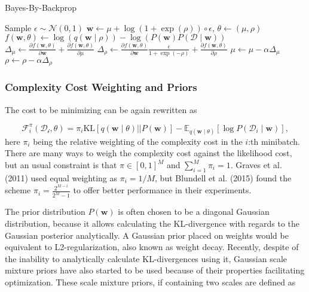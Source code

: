 	\begin{algorithm}[h]
		\caption{Bayes-By-Backprop}
		\label{alg:bbb}
		\begin{algorithmic}[1]
			\State Sample $\epsilon \sim \mathcal{N}(0,1)$ 
			\State $ \pmb{w} \gets \mu + \log(1 + \exp(\rho)) \circ  \epsilon$, $\theta \gets (\mu, \rho)$ 
			\State $f(\pmb{w}, \theta) \gets \log(q(\pmb{w}\mid \rho)) - \log(P(\pmb{w})P(\mathcal{D} \mid \pmb{w}))$ 
			\State $\Delta_\mu  \gets \frac{\partial f(\pmb{w},\theta)}{\partial \pmb{w}} + 
			\frac{\partial f(\pmb{w},\theta)}{\partial \mu}$ 
			\State $\Delta_\rho  \gets \frac{\partial f(\pmb{w},\theta)}{\partial \pmb{w}}\frac{\epsilon}{1 + \exp(-\rho)} +
			\frac{\partial f(\pmb{w},\theta)}{\partial \rho}$
			\State $\mu \gets \mu - \alpha \Delta_\mu$ 
			\State $\rho \gets \rho - \alpha \Delta_\rho$ 
			\EndFor
			\EndFor
			\EndFor
		\end{algorithmic}
	\end{algorithm}
	
	\subsubsection*{Complexity Cost Weighting and Priors}
	
	The cost to be minimizing can be again rewritten as 
	
	\begin{equation}
		\mathcal{F}^\pi_i(\mathcal{D_i}, \theta) = \pi_i \mathrm{KL}[q(\pmb{w} \mid \theta) || P(\pmb{w})] - \mathbb{E}_{q(\pmb{w} \mid \theta)}[\log P(\mathcal{D}_i \mid \pmb{w})],
	\end{equation}
	here $\pi_i$ being the relative weighting of the complexity cost in the $i$:th minibatch. 
	There are many ways to weigh the complexity cost against the likelihood cost, but an usual constraint is that $\pi \in [0,1]^M$ and $\sum_{i=1}^{M} \pi_i = 1$. Graves et al. (2011) \cite{graves_practical_2011} used equal weighting as $\pi_i = 1/M$, but Blundell et al. (2015) \cite{blundell_weight_2015} found the scheme $\pi_i =\frac{2^{M-i}}{2^M - 1}$ to offer better performance in their experiments. 

	
	The prior distribution $P(\pmb{w})$ is often chosen to be a diagonal Gaussian distribution, because it allows calculating the KL-divergence with regards to the Gaussian posterior analytically. A Gaussian prior placed on weights would be equivalent to L2-regularization, also known as weight decay. Recently, despite of the inability to analytically calculate KL-divergences using it, Gaussian scale mixture priors have also started to be used \cite{blundell_weight_2015, shridhar_comprehensive_2019} because of their properties facilitating optimization. These scale mixture priors, if containing two scales are defined as 
	
